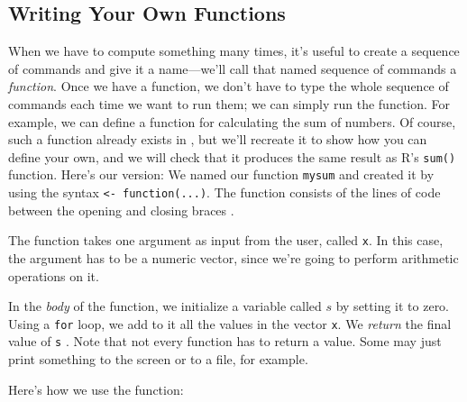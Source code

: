 \subsection{Writing Your Own Functions}
When we have to compute something many times, it's useful to
create a sequence of commands and give it a name---we'll call that named
sequence of commands a \emph{function}. 
Once we have a function, we don't
have to type the whole sequence of commands each time we want to run them;
we can simply run the function. For example, we can define a function for calculating
the sum of numbers. Of course, such a function already exists in \R, but we'll
recreate it to show how you can define your own, and we will check that it produces
the same result as R's \lstinline{sum()} function.  Here's our version:
We named our function \lstinline{mysum}  and created it by using the
syntax \lstinline{<- function(...)}. 
The function consists of the lines of code between the opening  and
closing braces .


The function takes one argument as input from the user, called \lstinline{x}. In this
case, the argument has to be a numeric vector, since we're going to perform
arithmetic operations on it.


In the \emph{body} of the function, we initialize a variable called $s$ by setting
it to zero. Using a \lstinline{for} loop, we add to it all the values in the
vector \lstinline{x}. We
\emph{return} the final value of \lstinline{s} .
Note that not every function has to return a value. Some may just print something
to the screen or to a file, for example. 

Here's how we use the function:

